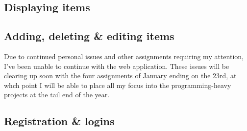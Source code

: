\documentclass{article}
\begin{document}
  \subsection{Displaying items}
  \subsection{Adding, deleting \& editing items}
    Due to continued personal issues and other assignments requiring my attention, I’ve been unable to continue with the web application. These issues will be clearing up soon with the four assignments of January ending on the 23rd, at whch point I will be able to place all my focus into the programming-heavy projects at the tail end of the year.
  \subsection{Registration \& logins}
    
\printbibliography[heading=bibnumbered]
\end{document}
